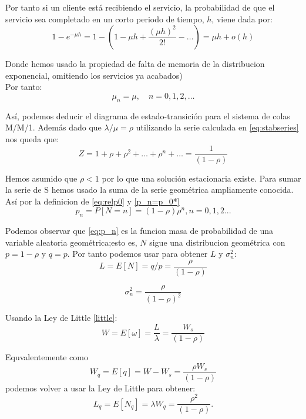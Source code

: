 \documentclass[a4paper,10pt]{scrartcl}
\theoremstyle{definition}
\theoremstyle{definition}
\numberwithin{equation}{section}
\begin{document}
	Por tanto si un cliente está recibiendo el servicio, la probabilidad de que el servicio sea completado en un corto periodo de tiempo, $h$, viene dada por:
	\begin{equation*}
	1-e^{-\mu h} = 1 - \left(1-\mu h+\frac{(\mu h)^2}{2!}- \dots\right)=\mu h +o(h)
	\end{equation*}
	
	Donde hemos usado la propiedad de falta de memoria de la distribucion exponencial, omitiendo los servicios ya acabados)\\
	Por tanto:
	\begin{equation*}
	\mu_n=\mu, \quad n=0,1,2,\dots
	\end{equation*}
	
	Así, podemos deducir el diagrama de estado-transición para el sistema de colas M/M/1. Además dado que $\lambda/\mu=\rho$ utilizando la serie calculada en \ref{eq:stabseries} nos queda que:
	\begin{equation*}
	Z=1+\rho+\rho^2+\dots+\rho^n+\dots=\frac{1}{(1-\rho)}
	\end{equation*}
	
	Hemos asumido que $\rho<1$ por lo que una solución estacionaria existe.
	Para sumar la serie de S hemos usado la suma de la serie geométrica ampliamente conocida.
	Así por la definicion de \ref{eq:relp0} y \ref{p_n=p_0*}
	\begin{equation}
	p_n=P[N=n]=(1-\rho)\rho^n, n=0,1,2...
	\label{eq:p_n}
	\end{equation}
	
	Podemos observar que \ref{eq:p_n} es la funcion masa de probabilidad de una variable aleatoria geométrica;esto
	es, $N$ sigue una distribucion geométrica con $p=1-\rho$ y $q=p$. Por tanto podemos usar para obtener $L$ 
	y $\sigma_n^2$:
	\begin{equation*}
	L=E[N]=q/p=\frac{\rho}{(1-\rho)}
	\end{equation*}
	
	\begin{equation*}
	\sigma_n^2=\frac{\rho}{(1-\rho)^2}
	\end{equation*}
	
	Usando la Ley de Little \ref{little}:
	\begin{equation*}
	W=E[\omega]=\frac{L}{\lambda}=\frac{W_s}{(1-\rho)}
	\end{equation*}
	
	Equvalentemente como \[ W_q=E[q]=W-W_s=\frac{\rho W_s}{(1-\rho)} \] podemos volver a usar la Ley de Little 
	para obtener:
	\begin{equation*}
	L_q=E[N_q]=\lambda W_q=\frac{\rho^2}{(1-\rho)}.
	\end{equation*}
	
\end{document}
